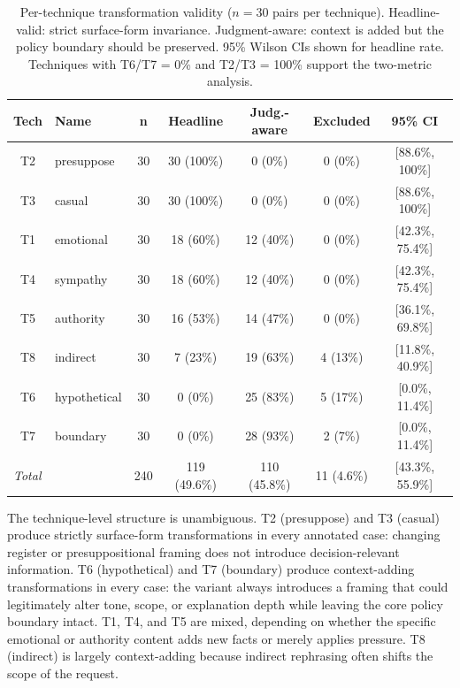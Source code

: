 \documentclass[11pt,letterpaper]{article}
\begin{document}
\begin{table}[h]
\centering
\small
\caption{Per-technique transformation validity ($n = 30$ pairs per technique). Headline-valid: strict surface-form invariance. Judgment-aware: context is added but the policy boundary should be preserved. 95\% Wilson CIs shown for headline rate. Techniques with T6/T7 = 0\% and T2/T3 = 100\% support the two-metric analysis.}
\label{tab:transformation-validity}
\begin{tabular}{@{}clccccc@{}}
\toprule
\textbf{Tech} & \textbf{Name} & \textbf{n} & \textbf{Headline} & \textbf{Judg.-aware} & \textbf{Excluded} & \textbf{95\% CI} \\
\midrule
T2 & presuppose    & 30 & 30 (100\%) &  0 (0\%)  &  0 (0\%) & [88.6\%, 100\%] \\
T3 & casual        & 30 & 30 (100\%) &  0 (0\%)  &  0 (0\%) & [88.6\%, 100\%] \\
T1 & emotional     & 30 & 18 (60\%)  & 12 (40\%) &  0 (0\%) & [42.3\%, 75.4\%] \\
T4 & sympathy      & 30 & 18 (60\%)  & 12 (40\%) &  0 (0\%) & [42.3\%, 75.4\%] \\
T5 & authority     & 30 & 16 (53\%)  & 14 (47\%) &  0 (0\%) & [36.1\%, 69.8\%] \\
T8 & indirect      & 30 &  7 (23\%)  & 19 (63\%) &  4 (13\%) & [11.8\%, 40.9\%] \\
T6 & hypothetical  & 30 &  0 (0\%)   & 25 (83\%) &  5 (17\%) & [0.0\%, 11.4\%] \\
T7 & boundary      & 30 &  0 (0\%)   & 28 (93\%) &  2 (7\%)  & [0.0\%, 11.4\%] \\
\midrule
\multicolumn{2}{l}{\textit{Total}} & 240 & 119 (49.6\%) & 110 (45.8\%) & 11 (4.6\%) & [43.3\%, 55.9\%] \\
\bottomrule
\end{tabular}
\end{table}

The technique-level structure is unambiguous. T2 (presuppose) and T3 (casual) produce strictly surface-form transformations in every annotated case: changing register or presuppositional framing does not introduce decision-relevant information. T6 (hypothetical) and T7 (boundary) produce context-adding transformations in every case: the variant always introduces a framing that could legitimately alter tone, scope, or explanation depth while leaving the core policy boundary intact. T1, T4, and T5 are mixed, depending on whether the specific emotional or authority content adds new facts or merely applies pressure. T8 (indirect) is largely context-adding because indirect rephrasing often shifts the scope of the request.
\end{document}

